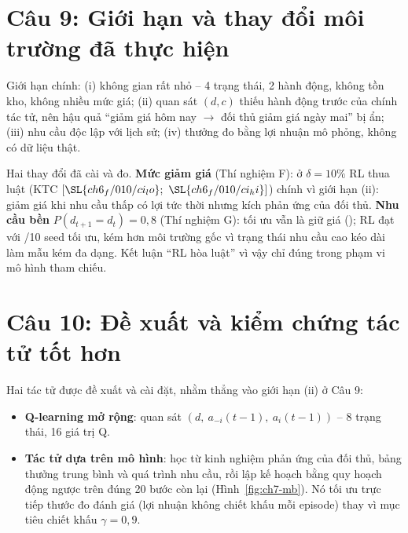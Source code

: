 \section{Câu 9: Giới hạn và thay đổi môi trường đã thực hiện}

Giới hạn chính: (i) không gian rất nhỏ -- 4 trạng thái, 2 hành động, không tồn kho, không nhiều mức giá; (ii) quan sát $(d,c)$ thiếu hành động trước của chính tác tử, nên hậu quả ``giảm giá hôm nay $\to$ đối thủ giảm giá ngày mai'' bị ẩn; (iii) nhu cầu độc lập với lịch sử; (iv) thưởng đo bằng lợi nhuận mô phỏng, không có dữ liệu thật.

Hai thay đổi đã cài và đo. \textbf{Mức giảm giá} (Thí nghiệm F): ở $\delta=10\%$ RL thua luật (KTC $[\SL{ch6_f/010/ci_lo};\ \SL{ch6_f/010/ci_hi}]$) chính vì giới hạn (ii): giảm giá khi nhu cầu thấp có lợi tức thời nhưng kích phản ứng của đối thủ. \textbf{Nhu cầu bền} $P(d_{t+1}=d_t)=0{,}8$ (Thí nghiệm G): tối ưu vẫn là giữ giá (); RL đạt  với /10 seed tối ưu, kém hơn môi trường gốc vì trạng thái nhu cầu cao kéo dài làm mẫu kém đa dạng. Kết luận ``RL hòa luật'' vì vậy chỉ đúng trong phạm vi mô hình tham chiếu.

\section{Câu 10: Đề xuất và kiểm chứng tác tử tốt hơn}

Hai tác tử được đề xuất và cài đặt, nhằm thẳng vào giới hạn (ii) ở Câu 9:
\begin{itemize}
  \item \textbf{Q-learning mở rộng}: quan sát $(d,\ a_{-i}(t-1),\ a_i(t-1))$ -- 8 trạng thái, 16 giá trị Q.
  \item \textbf{Tác tử dựa trên mô hình}: học từ kinh nghiệm phản ứng của đối thủ, bảng thưởng trung bình và quá trình nhu cầu, rồi lập kế hoạch bằng quy hoạch động ngược trên đúng 20 bước còn lại (Hình~\ref{fig:ch7-mb}). Nó tối ưu trực tiếp thước đo đánh giá (lợi nhuận không chiết khấu mỗi episode) thay vì mục tiêu chiết khấu $\gamma=0{,}9$.
\end{itemize}



